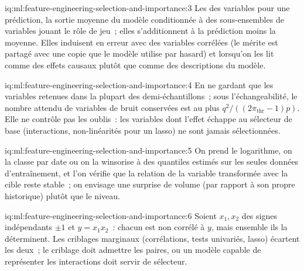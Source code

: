 \begin{solution}{iq:ml:feature-engineering-selection-and-importance:3}
Les  des variables pour une prédiction, la sortie moyenne du modèle conditionnée à des sous-ensembles de variables jouant le
rôle de jeu~; elles s'additionnent à la prédiction moins la moyenne. Elles induisent en erreur avec des variables corrélées (le mérite est partagé avec une copie que le modèle
utilise par hasard) et lorsqu'on les lit comme des effets causaux plutôt que comme des descriptions du modèle.
\end{solution}

\begin{solution}{iq:ml:feature-engineering-selection-and-importance:4}
En ne gardant que les variables retenues dans la plupart des demi-échantillons~; sous l'échangeabilité, le nombre attendu de variables de bruit conservées
est au plus $q^2/((2\pi_{\mathrm{thr}} - 1)p)$. Elle ne contrôle pas les oublis~: les variables dont l'effet échappe au sélecteur de base
(interactions, non-linéarités pour un lasso) ne sont jamais sélectionnées.
\end{solution}

\begin{solution}{iq:ml:feature-engineering-selection-and-importance:5}
On prend le logarithme, on la classe par date ou on la winsorise à des quantiles estimés sur les seules données d'entraînement, et l'on vérifie
que la relation de la variable transformée avec la cible reste stable~; on envisage une surprise de volume (par rapport à son propre historique) plutôt que le
niveau.
\end{solution}

\begin{solution}{iq:ml:feature-engineering-selection-and-importance:6}
Soient $x_1, x_2$ des signes indépendants $\pm1$ et $y = x_1x_2$~: chacun est non corrélé à $y$, mais ensemble ils la déterminent.
Les criblages marginaux (corrélations, tests univariés, lasso) écartent les deux~; le criblage doit admettre les paires, ou un modèle capable de
représenter les interactions doit servir de sélecteur.
\end{solution}
